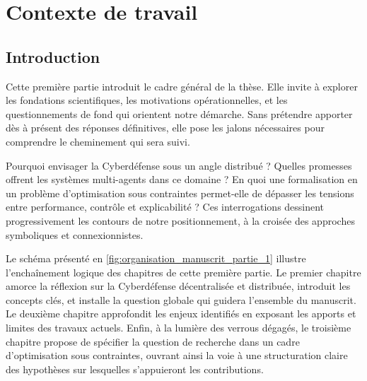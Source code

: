 \clearpage
\thispagestyle{empty}
\null
\newpage

\cleardoublepage
{}
\part{Contexte de travail}
\label{part:contexte}

\clearpage
\thispagestyle{empty}
\null
\newpage

\chapter*{Introduction}

\noindent
Cette première partie introduit le cadre général de la thèse. Elle invite à explorer les fondations scientifiques, les motivations opérationnelles, et les questionnements de fond qui orientent notre démarche. Sans prétendre apporter dès à présent des réponses définitives, elle pose les jalons nécessaires pour comprendre le cheminement qui sera suivi.

\medskip

\noindent
Pourquoi envisager la Cyberdéfense sous un angle distribué ? Quelles promesses offrent les systèmes multi-agents dans ce domaine ? En quoi une formalisation en un problème d'optimisation sous contraintes permet-elle de dépasser les tensions entre performance, contrôle et explicabilité ? Ces interrogations dessinent progressivement les contours de notre positionnement, à la croisée des approches symboliques et connexionnistes.

\medskip

\noindent
Le schéma présenté en \autoref{fig:organisation_manuscrit_partie_1} illustre l'enchaînement logique des chapitres de cette première partie. Le premier chapitre amorce la réflexion sur la Cyberdéfense décentralisée et distribuée, introduit les concepts clés, et installe la question globale qui guidera l'ensemble du manuscrit. Le deuxième chapitre approfondit les enjeux identifiés en exposant les apports et limites des travaux actuels. Enfin, à la lumière des verrous dégagés, le troisième chapitre propose de spécifier la question de recherche dans un cadre d'optimisation sous contraintes, ouvrant ainsi la voie à une structuration claire des hypothèses sur lesquelles s'appuieront les contributions.

